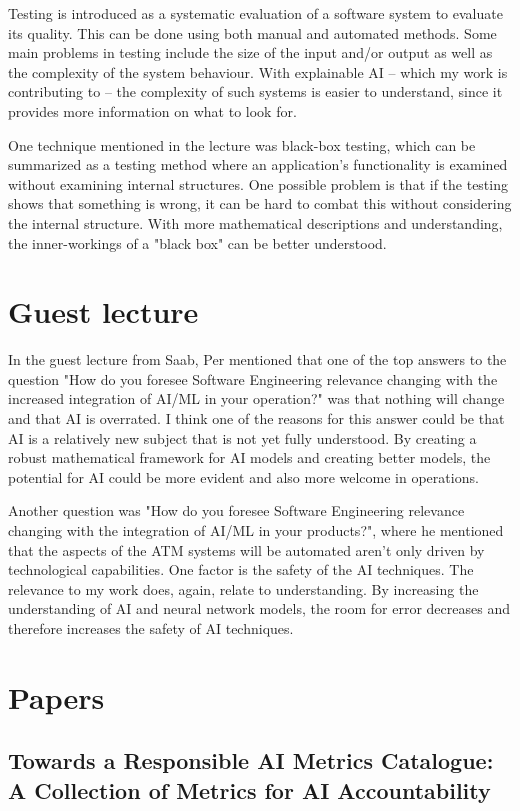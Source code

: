 \documentclass[11pt]{article}
\begin{document}
Testing is introduced as a systematic evaluation of a software system to evaluate its quality. This can be done using both manual and automated methods. Some main problems in testing include the size of the input and/or output as well as the complexity of the system behaviour. With explainable AI -- which my work is contributing to -- the complexity of such systems is easier to understand, since it provides more information on what to look for.

One technique mentioned in the lecture was black-box testing, which can be summarized as a testing method where an application's functionality is examined without examining internal structures. One possible problem is that if the testing shows that something is wrong, it can be hard to combat this without considering the internal structure. With more mathematical descriptions and understanding, the inner-workings of a "black box" can be better understood.

\section{Guest lecture}
In the guest lecture from Saab, Per mentioned that one of the top answers to the question "How do you foresee Software Engineering relevance changing with the increased integration of AI/ML in your operation?" was that nothing will change and that AI is overrated. I think one of the reasons for this answer could be that AI is a relatively new subject that is not yet fully understood. By creating a robust mathematical framework for AI models and creating better models, the potential for AI could be more evident and also more welcome in operations.

Another question was "How do you foresee Software Engineering relevance changing with the integration of AI/ML in your 
products?", where he mentioned that the aspects of the ATM systems will be automated aren't only driven by technological capabilities. One factor is the safety of the AI techniques. The relevance to my work does, again, relate to understanding. By increasing the understanding of AI and neural network models, the room for error decreases and therefore increases the safety of AI techniques.

\section{Papers}


\subsection{Towards a Responsible AI Metrics Catalogue: A Collection of Metrics for AI Accountability}
\end{document}

